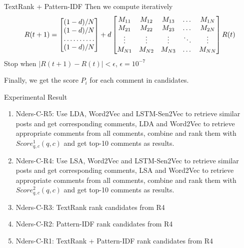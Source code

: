 \documentclass{beamer}
\begin{document}
    \begin{frame}{TextRank + Pattern-IDF}
      Then we compute iteratively
      \[
      R(t+1) = 
      \begin{bmatrix}
          (1-d)/N       \\
          (1-d)/N       \\
          \hdotsfor{1} \\
          (1-d)/N       
      \end{bmatrix}
      +d
      \begin{bmatrix}
          M_{11} & M_{12} & M_{13} & \dots  & M_{1N} \\
          M_{21} & M_{22} & M_{23} & \dots  & M_{2N} \\
          \vdots & \vdots & \vdots & \ddots & \vdots \\
          M_{N1} & M_{N2} & M_{N3} & \dots  & M_{NN}
      \end{bmatrix}
      R(t)
      \]
      Stop when $|R(t+1)-R(t)|<\epsilon$, $\epsilon = 10^{-7}$

      Finally, we get the score $P_i$ for each comment in candidates. 
    \end{frame}

  \begin{frame}{Experimental Result}
      \begin{enumerate}
  \item{Nders-C-R5: } Use LDA, Word2Vec and LSTM-Sen2Vec to retrieve similar posts 
  and get corresponding comments, LDA and Word2Vec to retrieve appropriate comments 
  from all comments, combine and rank them with $Score_{q,c}^1(q, c)$ and get top-10 comments as results.
  \item{Nders-C-R4: } Use LSA, Word2Vec and LSTM-Sen2Vec to retrieve similar posts 
  and get corresponding comments, LSA and Word2Vec to retrieve appropriate comments 
  from all comments, combine and rank them with $Score_{q,c}^2(q, c)$ and  get top-10 comments as results.
  \item{Nders-C-R3: } TextRank rank candidates from R4
  \item{Nders-C-R2: } Pattern-IDF rank candidates from R4
  \item{Nders-C-R1: } TextRank + Pattern-IDF rank candidates from R4
\end{enumerate}
    \end{frame}
\end{document}
